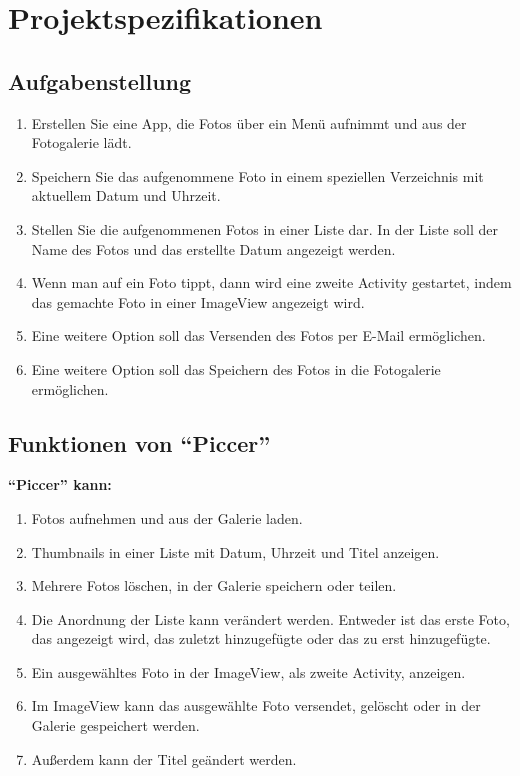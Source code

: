 
\chapter{Projektspezifikationen}

\section{Aufgabenstellung}
\begin{enumerate}
\item Erstellen Sie eine App, die Fotos über ein Menü aufnimmt und aus der Fotogalerie lädt.
\item Speichern Sie das aufgenommene Foto in einem speziellen Verzeichnis mit aktuellem Datum und Uhrzeit.
\item Stellen Sie die aufgenommenen Fotos in einer Liste dar. In der Liste soll der Name des Fotos und das erstellte Datum angezeigt werden.
\item Wenn man auf ein Foto tippt, dann wird eine zweite Activity gestartet, indem das gemachte Foto in einer ImageView angezeigt wird.
\item Eine weitere Option soll das Versenden des Fotos per E-Mail ermöglichen.
\item Eine weitere Option soll das Speichern des Fotos in die Fotogalerie ermöglichen.
\end{enumerate}

\section{Funktionen von \enquote{Piccer}}
\textbf{\enquote{Piccer} kann:}
\begin{enumerate}
\item Fotos aufnehmen und aus der Galerie laden.
\item Thumbnails in einer Liste mit Datum, Uhrzeit und Titel anzeigen. 
\item Mehrere Fotos löschen, in der Galerie speichern oder teilen.
\item Die Anordnung der Liste kann verändert werden. Entweder ist das erste Foto, das angezeigt wird, das zuletzt hinzugefügte oder das zu erst hinzugefügte.
\item Ein ausgewähltes Foto in der ImageView, als zweite Activity, anzeigen.
\item Im ImageView kann das ausgewählte Foto versendet, gelöscht oder in der Galerie gespeichert werden.
\item Außerdem kann der Titel geändert werden.

\end{enumerate}


